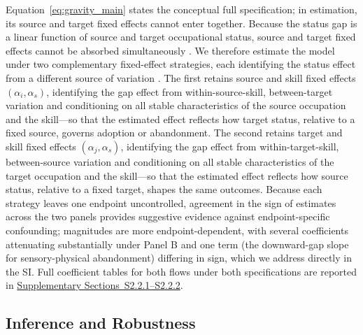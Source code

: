 \documentclass[11pt, letterpaper]{article} %
\newcommand{\parencite}[1]{\cite{#1}}
\begin{document}
Equation~\ref{eq:gravity_main} states the conceptual full specification; in estimation, its source and target fixed effects cannot enter together. Because the status gap is a linear function of source and target occupational status, source and target fixed effects cannot be absorbed simultaneously \parencite{FafchampsGubert2007, HeadMayer2014}. We therefore estimate the model under two complementary fixed-effect strategies, each identifying the status effect from a different source of variation \parencite{BeineBertoliFernandezHuertas2016}. The first retains source and skill fixed effects $(\alpha_i, \alpha_s)$, identifying the gap effect from within-source-skill, between-target variation and conditioning on all stable characteristics of the source occupation and the skill---so that the estimated effect reflects how target status, relative to a fixed source, governs adoption or abandonment. The second retains target and skill fixed effects $(\alpha_j, \alpha_s)$, identifying the gap effect from within-target-skill, between-source variation and conditioning on all stable characteristics of the target occupation and the skill---so that the estimated effect reflects how source status, relative to a fixed target, shapes the same outcomes. Because each strategy leaves one endpoint uncontrolled, agreement in the sign of estimates across the two panels provides suggestive evidence against endpoint-specific confounding; magnitudes are more endpoint-dependent, with several coefficients attenuating substantially under Panel B and one term (the downward-gap slope for sensory-physical abandonment) differing in sign, which we address directly in the SI. Full coefficient tables for both flows under both specifications are reported in \hyperref[sec:SI_coef_adopt]{Supplementary Sections~S2.2.1--S2.2.2}.

\subsection*{Inference and Robustness}
\end{document}
